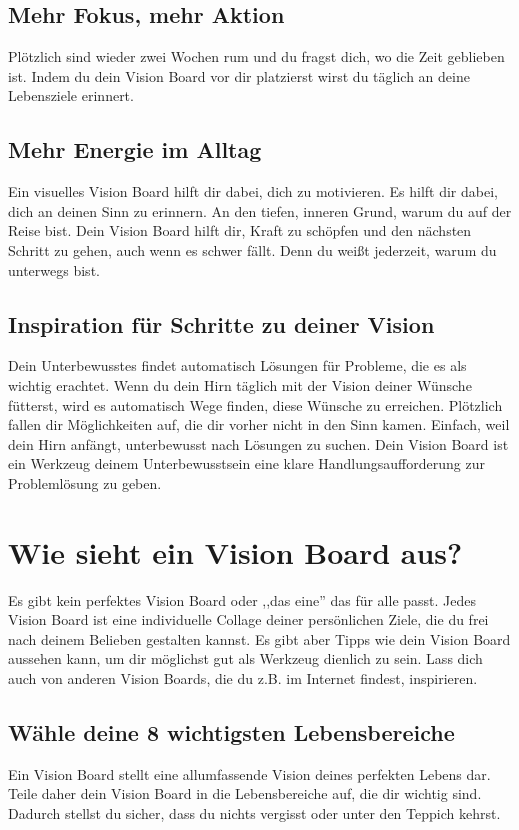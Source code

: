 \documentclass[../Lebensziel.tex]{subfiles}
\begin{document}
\subsection{Mehr Fokus, mehr Aktion}
Plötzlich sind wieder zwei Wochen rum und du fragst dich, wo die Zeit geblieben ist.
Indem du dein Vision Board vor dir platzierst wirst du täglich an deine Lebensziele erinnert.

\subsection{Mehr Energie im Alltag}
Ein visuelles Vision Board hilft dir dabei, dich zu motivieren. Es hilft dir dabei, dich an deinen Sinn zu erinnern. An den tiefen, inneren Grund, warum du auf der Reise bist.
Dein Vision Board hilft dir, Kraft zu schöpfen und den nächsten Schritt zu gehen, auch wenn es schwer fällt. Denn du weißt jederzeit, warum du unterwegs bist.

\subsection{Inspiration für Schritte zu deiner Vision}
Dein Unterbewusstes findet automatisch Lösungen für Probleme, die es als wichtig erachtet.
Wenn du dein Hirn täglich mit der Vision deiner Wünsche fütterst, wird es automatisch Wege finden, diese Wünsche zu erreichen.
Plötzlich fallen dir Möglichkeiten auf, die dir vorher nicht in den Sinn kamen. Einfach, weil dein Hirn anfängt, unterbewusst nach Lösungen zu suchen.
Dein Vision Board ist ein Werkzeug deinem Unterbewusstsein eine klare Handlungsaufforderung zur Problemlösung zu geben.

\section{Wie sieht ein Vision Board aus?}
Es gibt kein perfektes Vision Board oder ,,das eine'' das für alle passt. Jedes Vision Board ist eine individuelle Collage deiner persönlichen Ziele, die du frei nach deinem Belieben gestalten kannst.
Es gibt aber Tipps wie dein Vision Board aussehen kann, um dir möglichst gut als Werkzeug dienlich zu sein. Lass dich auch von anderen Vision Boards, die du z.B. im Internet findest, inspirieren.

\subsection{Wähle deine 8 wichtigsten Lebensbereiche}
Ein Vision Board stellt eine allumfassende Vision deines perfekten Lebens dar. Teile daher dein Vision Board in die Lebensbereiche auf, die dir wichtig sind. Dadurch stellst du sicher, dass du nichts vergisst oder unter den Teppich kehrst.
\end{document}
